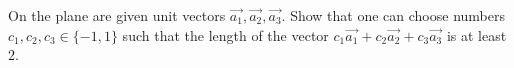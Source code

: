 On the plane are given unit vectors $\overrightarrow{a_1},\overrightarrow{a_2},\overrightarrow{a_3}$. Show that one can choose numbers $c_1,c_2,c_3 \in \{-1,1\}$ such that the length of the vector $c_1\overrightarrow{a_1}+c_2\overrightarrow{a_2}+c_3\overrightarrow{a_3}$ is at least $2$.